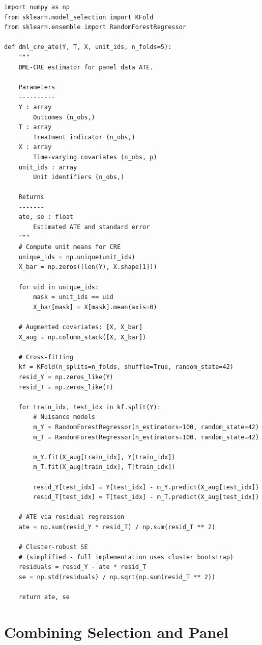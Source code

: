 \begin{verbatim}
import numpy as np
from sklearn.model_selection import KFold
from sklearn.ensemble import RandomForestRegressor

def dml_cre_ate(Y, T, X, unit_ids, n_folds=5):
    """
    DML-CRE estimator for panel data ATE.

    Parameters
    ----------
    Y : array
        Outcomes (n_obs,)
    T : array
        Treatment indicator (n_obs,)
    X : array
        Time-varying covariates (n_obs, p)
    unit_ids : array
        Unit identifiers (n_obs,)

    Returns
    -------
    ate, se : float
        Estimated ATE and standard error
    """
    # Compute unit means for CRE
    unique_ids = np.unique(unit_ids)
    X_bar = np.zeros((len(Y), X.shape[1]))

    for uid in unique_ids:
        mask = unit_ids == uid
        X_bar[mask] = X[mask].mean(axis=0)

    # Augmented covariates: [X, X_bar]
    X_aug = np.column_stack([X, X_bar])

    # Cross-fitting
    kf = KFold(n_splits=n_folds, shuffle=True, random_state=42)
    resid_Y = np.zeros_like(Y)
    resid_T = np.zeros_like(T)

    for train_idx, test_idx in kf.split(Y):
        # Nuisance models
        m_Y = RandomForestRegressor(n_estimators=100, random_state=42)
        m_T = RandomForestRegressor(n_estimators=100, random_state=42)

        m_Y.fit(X_aug[train_idx], Y[train_idx])
        m_T.fit(X_aug[train_idx], T[train_idx])

        resid_Y[test_idx] = Y[test_idx] - m_Y.predict(X_aug[test_idx])
        resid_T[test_idx] = T[test_idx] - m_T.predict(X_aug[test_idx])

    # ATE via residual regression
    ate = np.sum(resid_Y * resid_T) / np.sum(resid_T ** 2)

    # Cluster-robust SE
    # (simplified - full implementation uses cluster bootstrap)
    residuals = resid_Y - ate * resid_T
    se = np.std(residuals) / np.sqrt(np.sum(resid_T ** 2))

    return ate, se
\end{verbatim}


\section{Combining Selection and Panel}

